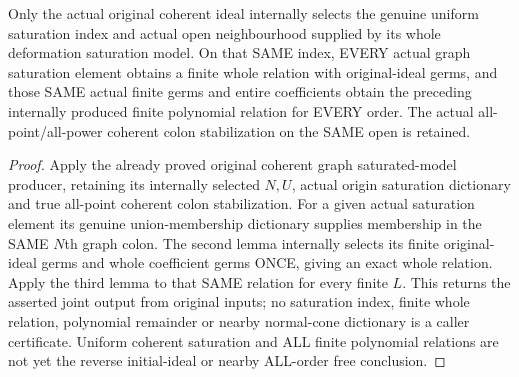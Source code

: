 \begin{theorem}
\label{hir:relative-normal-graph-relations-original-coherent-consumer}
\leanok
Only the actual original coherent ideal internally selects the genuine uniform saturation index and actual open neighbourhood supplied by its whole deformation saturation model. On that SAME index, EVERY actual graph saturation element obtains a finite whole relation with original-ideal germs, and those SAME actual finite germs and entire coefficients obtain the preceding internally produced finite polynomial relation for EVERY order. The actual all-point/all-power coherent colon stabilization on the SAME open is retained.
\end{theorem}
\begin{proof}
Apply the already proved original coherent graph saturated-model producer, retaining its internally selected $N,U$, actual origin saturation dictionary and true all-point coherent colon stabilization. For a given actual saturation element its genuine union-membership dictionary supplies membership in the SAME $N$th graph colon. The second lemma internally selects its finite original-ideal germs and whole coefficient germs ONCE, giving an exact whole relation. Apply the third lemma to that SAME relation for every finite $L$. This returns the asserted joint output from original inputs; no saturation index, finite whole relation, polynomial remainder or nearby normal-cone dictionary is a caller certificate. Uniform coherent saturation and ALL finite polynomial relations are not yet the reverse initial-ideal or nearby ALL-order free conclusion.
\end{proof}
